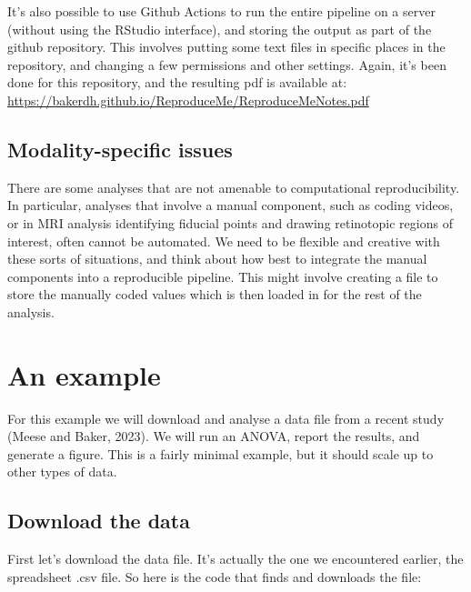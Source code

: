 \documentclass[
]{article}
\begin{document}
It's also possible to use Github Actions to run the entire pipeline on a server (without using the RStudio interface), and storing the output as part of the github repository. This involves putting some text files in specific places in the repository, and changing a few permissions and other settings. Again, it's been done for this repository, and the resulting pdf is available at: \url{https://bakerdh.github.io/ReproduceMe/ReproduceMeNotes.pdf}

\hypertarget{modality-specific-issues}{%
\subsection{Modality-specific issues}\label{modality-specific-issues}}

There are some analyses that are not amenable to computational reproducibility. In particular, analyses that involve a manual component, such as coding videos, or in MRI analysis identifying fiducial points and drawing retinotopic regions of interest, often cannot be automated. We need to be flexible and creative with these sorts of situations, and think about how best to integrate the manual components into a reproducible pipeline. This might involve creating a file to store the manually coded values which is then loaded in for the rest of the analysis.

\hypertarget{an-example}{%
\section{An example}\label{an-example}}

For this example we will download and analyse a data file from a recent study (Meese and Baker, 2023). We will run an ANOVA, report the results, and generate a figure. This is a fairly minimal example, but it should scale up to other types of data.

\hypertarget{download-the-data}{%
\subsection{Download the data}\label{download-the-data}}

First let's download the data file. It's actually the one we encountered earlier, the spreadsheet .csv file. So here is the code that finds and downloads the file:
\end{document}
